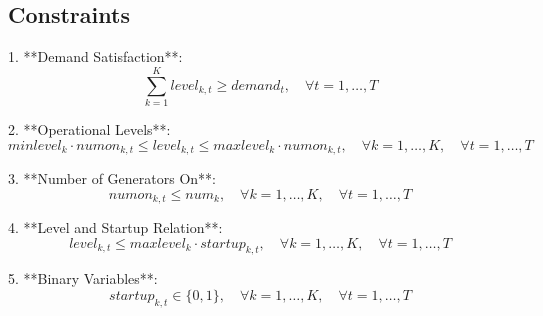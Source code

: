 \documentclass{article}
\begin{document}
\subsection*{Constraints}

1. **Demand Satisfaction**:
\[
\sum_{k=1}^{K} level_{k,t} \geq demand_t, \quad \forall t = 1, \ldots, T
\]

2. **Operational Levels**:
\[
minlevel_k \cdot numon_{k,t} \leq level_{k,t} \leq maxlevel_k \cdot numon_{k,t}, \quad \forall k = 1, \ldots, K, \quad \forall t = 1, \ldots, T
\]

3. **Number of Generators On**:
\[
numon_{k,t} \leq num_k, \quad \forall k = 1, \ldots, K, \quad \forall t = 1, \ldots, T
\]

4. **Level and Startup Relation**:
\[
level_{k,t} \leq maxlevel_k \cdot startup_{k,t}, \quad \forall k = 1, \ldots, K, \quad \forall t = 1, \ldots, T
\]

5. **Binary Variables**:
\[
startup_{k,t} \in \{0, 1\}, \quad \forall k = 1, \ldots, K, \quad \forall t = 1, \ldots, T
\]
\end{document}
